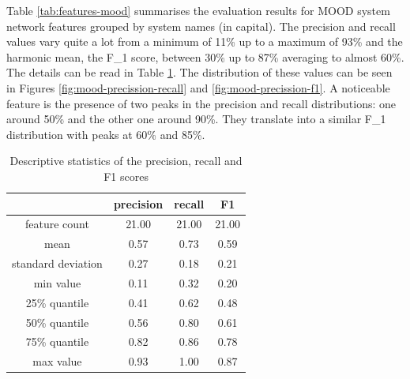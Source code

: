 Table \ref{tab:features-mood} summarises the evaluation results for MOOD system network features grouped by system names (in capital). The precision and recall values vary quite a lot from a minimum of 11\% up to a maximum of 93\% and the harmonic mean, the F_1 score, between 30\% up to 87\%  averaging to almost 60\%. The details can be read in Table \ref{tab:mood-accuracy}. The distribution of these values can be seen in Figures \ref{fig:mood-precission-recall} and \ref{fig:mood-precission-f1}. A noticeable feature is the presence of two peaks in the precision and recall distributions: one around 50\% and the other one around 90\%. They translate into a similar F_1 distribution with peaks at 60\% and 85\%.

\begin{table}[!ht]
    \centering
    \begin{tabular}{|c|c|c|c|}
        \hline
        \textbf{} & \textbf{precision} & \textbf{recall} & \textbf{F1} \\ \hline
        feature count & 21.00 & 21.00 & 21.00 \\ \hline
        mean & 0.57 & 0.73 & 0.59 \\ \hline
        standard deviation & 0.27 & 0.18 & 0.21 \\ \hline
        min value & 0.11 & 0.32 & 0.20 \\ \hline
        25\% quantile & 0.41 & 0.62 & 0.48 \\ \hline
        50\% quantile & 0.56 & 0.80 & 0.61 \\ \hline
        75\% quantile & 0.82 & 0.86 & 0.78 \\ \hline
        max value & 0.93 & 1.00 & 0.87 \\ \hline
    \end{tabular}
    \caption{Descriptive statistics of the precision, recall and F1 scores}
    \label{tab:mood-accuracy}
\end{table}

